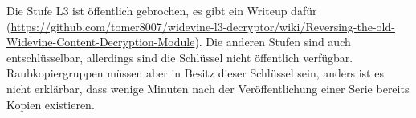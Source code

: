 \documentclass{article}
\begin{document}
	Die Stufe L3 ist öffentlich gebrochen, es gibt ein Writeup dafür (\url{https://github.com/tomer8007/widevine-l3-decryptor/wiki/Reversing-the-old-Widevine-Content-Decryption-Module}). Die anderen Stufen sind auch ent\-schlüsselbar, allerdings sind die Schlüssel nicht öffentlich verfügbar. Raubkopiergruppen müssen aber in Besitz dieser Schlüssel sein, anders ist es nicht erklärbar, dass wenige Minuten nach der Veröffentlichung einer Serie bereits Kopien existieren.
\end{document}
